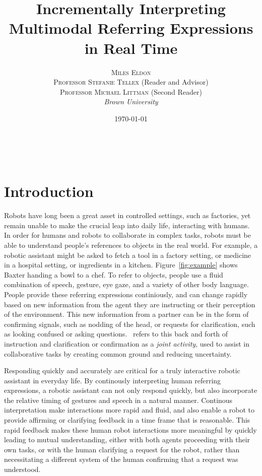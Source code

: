 \documentclass[a4paper, 11pt]{article} %
\title{\textbf{Incrementally Interpreting Multimodal Referring Expressions in Real Time}} %
\author{\textsc{Miles Eldon}\\ %
\textsc{Professor Stefanie Tellex} (Reader and Advisor)\\
{\textsc{Professor Michael Littman} (Second Reader)}
\\{\textit{Brown University}}} %
\date{\today} %
\makeatletter
\renewcommand{\maketitle}{ %
\begin{flushright} %
{\LARGE\@title} %

\vspace{50pt} %

{\large\@author} %
\\\@date %

\vspace{40pt} %
\end{flushright}
}
\makeatother
\begin{document}
\maketitle %
\newpage
\tableofcontents
\newpage
\section{Introduction}
Robots have long been a great asset in controlled settings, such as factories, yet remain unable to make the crucial leap into daily life, interacting with humans. In order for humans and robots to collaborate in complex tasks, robots must be able to understand people's references to objects in the real world. For example, a robotic assistant might be asked to fetch a tool in a factory setting, or medicine in a hospital setting, or ingredients in a kitchen. Figure~\ref{fig:example} shows Baxter handing a bowl to a chef. To refer to objects, people use a fluid combination of speech, gesture, eye gaze, and a variety of other body language. People provide these referring expressions continiously, and can change rapidly based on new information from the agent they are instructing or their perception of the environment. This new information from a partner can be in the form of confirming signals, such as nodding of the head, or requests for clarification, such as looking confused or asking questions.~\citet{clark96} refers to this back and forth of instruction and clarification or confirmation as a \textit{joint activity}, used to assist in collaborative tasks by creating common ground and reducing uncertainty.


Responding quickly and accurately are critical for a truly interactive robotic assistant in everyday life. By continously interpreting human referring expressions, a robotic assistant can not only respond quickly, but also incorporate the relative timing of gestures and speech in a natural manner. Continous interpretation make interactions more rapid and fluid, and also enable a robot to provide affirming or clarifying feedback in a time frame that is reasonable. This rapid feedback makes these human robot interactions more meaningful by quickly leading to mutual understanding, either with both agents proceeding with their own tasks, or with the human clarifying a request for the robot, rather than necessitating a different system of the human confirming that a request was understood.
\end{document}
